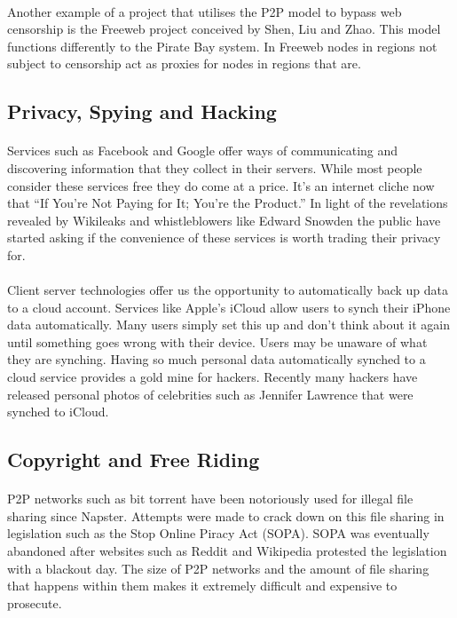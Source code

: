 \documentclass[11pt]{amsart}
\begin{document}
\paragraph{}
Another example of a project that utilises the P2P model to bypass web censorship is the Freeweb project conceived by Shen, Liu and Zhao.\cite{FreeWeb} This model functions differently to the Pirate Bay system. In Freeweb nodes in regions not subject to censorship act as proxies for nodes in regions that are. 


\subsection{Privacy, Spying and Hacking}
\paragraph{}
Services such as Facebook and Google offer ways of communicating and discovering information that they collect in their servers. While most people consider these services free they do come at a price. It's an internet cliche now that ``If You're Not Paying for It; You're the Product.'' In light of the revelations revealed by Wikileaks and whistleblowers like Edward Snowden the public have started asking if the convenience of these services is worth trading their privacy for.
\paragraph{}
Client server technologies offer us the opportunity to automatically back up data to a cloud account. Services like Apple's iCloud allow users to synch their iPhone data automatically. Many users simply set this up and don't think about it again until something goes wrong with their device. Users may be unaware of what they are synching. Having so much personal data automatically synched to a cloud service provides a gold mine for hackers. Recently many hackers have released personal photos of celebrities such as Jennifer Lawrence that were synched to iCloud.

\subsection{Copyright and Free Riding}
\paragraph{}
P2P networks such as bit torrent have been notoriously used for illegal file sharing since Napster. Attempts were made to crack down on this file sharing in legislation such as the Stop Online Piracy Act (SOPA). SOPA was eventually abandoned after websites such as Reddit and Wikipedia protested the legislation with a blackout day. The size of P2P networks and the amount of file sharing that happens within them makes it extremely difficult and expensive to prosecute.
\end{document}
